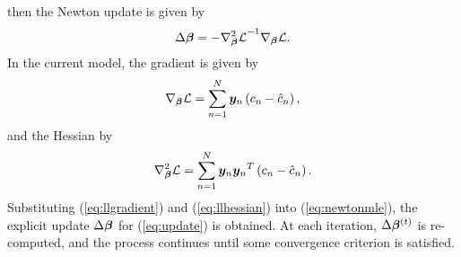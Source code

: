 then the Newton update is given by
\begin{equation}
  \Delta\bb = -{\nabla^2_{\bb}\L}^{-1}\nabla_{\bb}\L.%
  \label{eq:newtonmle}
\end{equation}
In the current model, the gradient is given by
\begin{equation}
  \nabla_{\bb}\L = \sum_{n=1}^{N} \by_n\left(c_n - \hat{c}_n\right),%
  \label{eq:llgradient}
\end{equation}
and the Hessian by
\begin{equation}
  \nabla^2_{\bb}\L = \sum_{n=1}^{N} \by_n{\by_n}^T \left(c_n - \hat{c}_n\right).%
  \label{eq:llhessian}
\end{equation}
Substituting (\ref{eq:llgradient}) and (\ref{eq:llhessian}) into (\ref{eq:newtonmle}),
the explicit update $\Delta\bm{\beta}$ for (\ref{eq:update}) is obtained.
At each iteration, $\Delta\bm{\beta}^{(t)}$ is re-computed,
and the process continues until some convergence criterion is satisfied.
